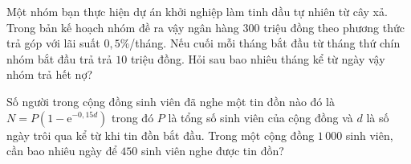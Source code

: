 \begin{ex}%
	Một nhóm bạn thực hiện dự án khởi nghiệp làm tinh dầu tự nhiên từ cây xả. Trong bản kế hoạch nhóm đề ra vậy ngân hàng $300$ triệu đồng theo phương thức trả góp với lãi suất $0{,}5\%$/tháng. Nếu cuối mỗi tháng bắt đầu từ tháng thứ chín nhóm bắt đầu trả trả $10$ triệu  đồng. Hỏi sau bao nhiêu tháng kể từ ngày vậy nhóm trả hết nợ?
\end{ex}

\begin{ex}%
	Số người  trong cộng đồng sinh viên đã nghe một tin đồn nào đó là $N=P\left(1-\mathrm{e}^{-0,15d} \right)$ trong đó $P$ là tổng số sinh viên của cộng đồng và $d$ là số ngày trôi qua kể từ khi tin đồn bắt đầu. Trong một cộng đồng $1\,000$ sinh viên, cần bao nhiêu ngày để $450$ sinh viên nghe được tin đồn?
\end{ex}

